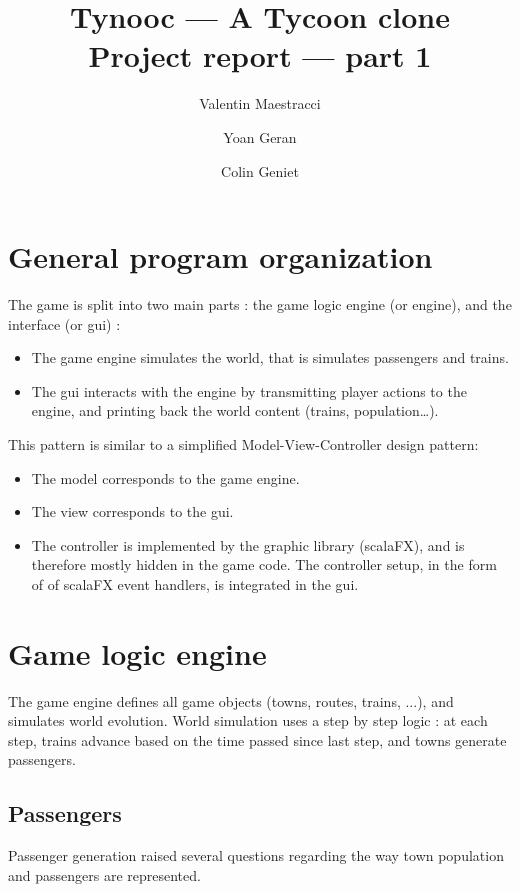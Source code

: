 \documentclass{article}
\begin{document}
\title{Tynooc --- A Tycoon clone \\ \large{Project report --- part 1}}
\author{Valentin Maestracci \and Yoan Geran \and Colin Geniet}
\maketitle

\tableofcontents

\section{General program organization}
The game is split into two main parts : the game logic engine (or engine), and the interface (or gui) :
\begin{itemize}
\item The game engine simulates the world, that is simulates passengers and trains.
\item The gui interacts with the engine by transmitting player actions to the engine, 
and printing back the world content (trains, population\dots).
\end{itemize}

This pattern is similar to a simplified Model-View-Controller design pattern:
\begin{itemize}[noitemsep]
\item The model corresponds to the game engine.
\item The view corresponds to the gui.
\item The controller is implemented by the graphic library (scalaFX), and is therefore mostly hidden in the game code.
The controller setup, in the form of of scalaFX event handlers, is integrated in the gui.
\end{itemize}



\section{Game logic engine}
The game engine defines all game objects (towns, routes, trains, ...), and simulates world evolution.
World simulation uses a step by step logic : at each step, trains advance based on the time passed since last step,
and towns generate passengers.

\subsection{Passengers}
Passenger generation raised several questions regarding the way town population and passengers are represented.
\end{document}
